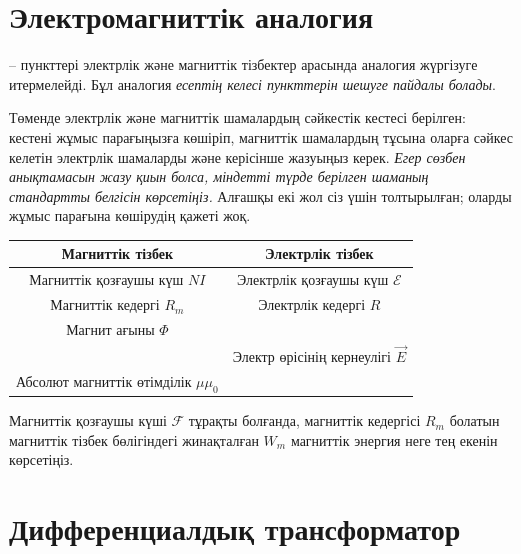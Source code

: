 \part{Электромагниттік аналогия}

-- пункттері электрлік және магниттік тізбектер арасында аналогия жүргізуге итермелейді. Бұл аналогия \textit{есептің келесі пункттерін шешуге пайдалы болады}.

\begin{task}
    \item Төменде электрлік және магниттік шамалардың сәйкестік кестесі берілген: кестені жұмыс парағыңызға көшіріп, магниттік шамалардың тұсына оларға сәйкес келетін электрлік шамаларды және керісінше жазуыңыз керек. \textit{Егер сөзбен анықтамасын жазу қиын болса, міндетті түрде берілген шаманың стандартты белгісін көрсетіңіз.} Алғашқы екі жол сіз үшін толтырылған; оларды жұмыс парағына көшірудің қажеті жоқ.
    \begin{center}
    \begin{tabular}{|c|c|}\hline
         \textbf{Магниттік тізбек}& \textbf{Электрлік тізбек} \\\hline
         Магниттік қозғаушы күш $NI$& Электрлік қозғаушы күш $\mathcal E$\\\hline
         Магниттік кедергі $R_m$& Электрлік кедергі $R$\\\hline
         Магнит ағыны $\Phi$ &\\\hline
         &Электр өрісінің кернеулігі $\vec E$ \\\hline
         Абсолют магниттік өтімділік $\mu\mu_0$&\\\hline
    \end{tabular}
    \end{center}

    \item Магниттік қозғаушы күші $\mathcal F$ тұрақты болғанда, магниттік кедергісі $R_m$ болатын магниттік тізбек бөлігіндегі жинақталған $W_m$ магниттік энергия неге тең екенін көрсетіңіз.
\end{task}

\part{Дифференциалдық трансформатор}

